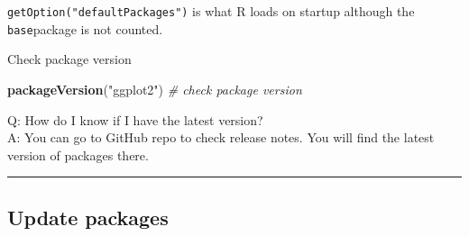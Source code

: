 \documentclass[
  a4paper,
  twoside,
  openright]{book}
\newenvironment{Shaded}{\begin{snugshade}}{\end{snugshade}}
\newcommand{\CommentTok}[1]{\textcolor[rgb]{0.56,0.35,0.01}{\textit{#1}}}
\newcommand{\FunctionTok}[1]{\textcolor[rgb]{0.13,0.29,0.53}{\textbf{#1}}}
\newcommand{\NormalTok}[1]{#1}
\newcommand{\StringTok}[1]{\textcolor[rgb]{0.31,0.60,0.02}{#1}}
\theoremstyle{definition}
\theoremstyle{definition}
\theoremstyle{definition}
\theoremstyle{definition}
\theoremstyle{remark}
\begin{document}
\texttt{getOption("defaultPackages")} is what R loads on startup although the \texttt{base}package is not counted.

Check package version

\begin{Shaded}
\begin{Highlighting}[]
\FunctionTok{packageVersion}\NormalTok{(}\StringTok{"ggplot2"}\NormalTok{) }\CommentTok{\# check package version}
\end{Highlighting}
\end{Shaded}

Q: How do I know if I have the latest version?\\
A: You can go to GitHub repo to check release notes. You will find the latest version of packages there.

\begin{center}\rule{0.5\linewidth}{0.5pt}\end{center}

\subsection{Update packages}\label{update-packages}
\end{document}
